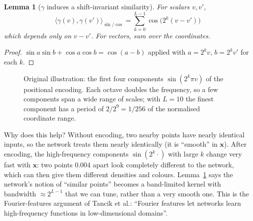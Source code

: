 \documentclass[11pt,a4paper]{article}
\newcommand{\xx}{\boldsymbol{x}}
\theoremstyle{definition}
\theoremstyle{plain}
\newtheorem{lemma}[definition]{Lemma}
\theoremstyle{remark}
\begin{document}
\begin{lemma}[$\gamma$ induces a shift-invariant similarity]\label{lem:gammakernel}
For scalars $v,v'$,
\[
\langle\gamma(v),\gamma(v')\rangle_{\sin/\cos}=\sum_{k=0}^{L-1}\cos\!\big(2^k(v-v')\big)
\]
which depends only on $v-v'$. For vectors, sum over the coordinates.
\end{lemma}
\begin{proof}
$\sin a\sin b+\cos a\cos b=\cos(a-b)$ applied with $a=2^kv$, $b=2^kv'$ for each $k$.
\end{proof}

\begin{figure}[H]
\centering
{}
\caption{Original illustration: the first four components $\sin(2^k\pi v)$ of the positional encoding. Each octave doubles the frequency, so a few components span a wide range of scales; with $L=10$ the finest component has a period of $2/2^{9}=1/256$ of the normalised coordinate range.}
\end{figure}

\begin{intuition}
Why does this help? Without encoding, two nearby points have nearly identical inputs, so the network treats them nearly identically (it is ``smooth'' in $\xx$). After encoding, the high-frequency components $\sin(2^{k}\cdot)$ with large $k$ change very fast with $\xx$: two points $0.004$ apart look completely different to the network, which can then give them different densities and colours. Lemma~\ref{lem:gammakernel} says the network's notion of ``similar points'' becomes a band-limited kernel with bandwidth $\approx 2^{L-1}$ that we can tune, rather than a very smooth one. This is the Fourier-features argument of Tancik et al.: ``Fourier features let networks learn high-frequency functions in low-dimensional domains''.
\end{intuition}
\end{document}
